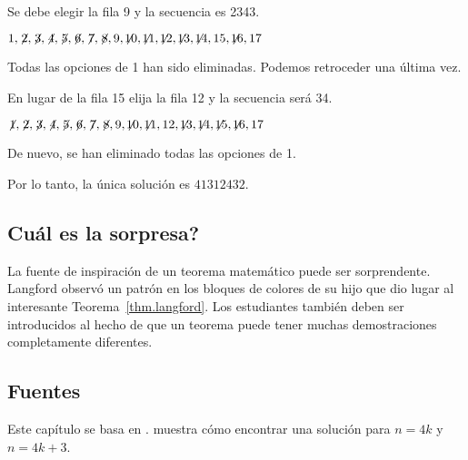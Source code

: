 \noindent Se debe elegir la fila 9 y la secuencia es 2{}34{}3.

$1,\not\! 2,\not\! 3,\not\! 4,\not\! 5,\not\! 6,\not\! 7,\not\! 8,9,\not\!\! 10,\not\!\! 11,\not\!\! 12,\not\!\! 13,\not\!\! 14,15,\not\!\! 16,17$

\noindent Todas las opciones de 1 han sido eliminadas. Podemos retroceder una última vez. 

\smallskip

\noindent En lugar de la fila 15 elija la fila 12 y la secuencia será 3{}4\textvisiblespace {}.

$\not\! 1,\not\! 2,\not\! 3,\not\! 4,\not\! 5,\not\! 6,\not\! 7,\not\! 8,9,\not\!\! 10,\not\!\! 11,12,\not\!\! 13,\not\!\! 14,\not\!\! 15,\not\!\! 16,17$

\noindent De nuevo, se han eliminado todas las opciones de 1.

\medskip

\noindent Por lo tanto, la única solución es $41312432$.

\subsection*{Cuál es la sorpresa?}

La fuente de inspiración de un teorema matemático puede ser sorprendente. Langford observó un patrón en los bloques de colores de su hijo que dio lugar al interesante Teorema~\ref{thm.langford}. Los estudiantes también deben ser introducidos al hecho de que un teorema puede tener muchas demostraciones completamente diferentes.

\subsection*{Fuentes}
Este capítulo se basa en \cite{miller}. \cite{davies} muestra cómo encontrar una solución para $n=4k$ y $n=4k+3$.
